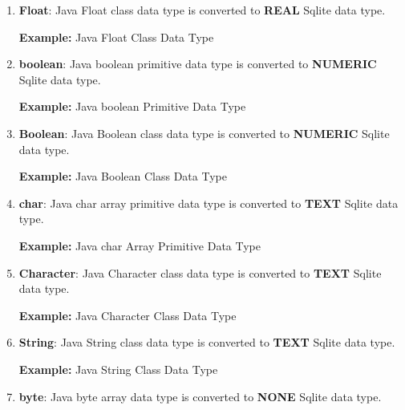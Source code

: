 \begin{enumerate}
	\item \small \textbf{Float}: Java Float class data type is converted to \textbf{REAL} Sqlite data type.

		\par
		\textbf{Example:} Java Float Class Data Type
			

	\item \small \textbf{boolean}: Java boolean primitive data type is converted to \textbf{NUMERIC} Sqlite data type.

		\par
		\textbf{Example:} Java boolean Primitive Data Type
			

	\item \small \textbf{Boolean}: Java Boolean class data type is converted to \textbf{NUMERIC} Sqlite data type.

		\par
		\textbf{Example:} Java Boolean Class Data Type
			

	\item \small \textbf{char}: Java char array primitive data type is converted to \textbf{TEXT} Sqlite data type.

		\par
		\textbf{Example:} Java char Array Primitive Data Type
			

	\item \small \textbf{Character}: Java Character class data type is converted to \textbf{TEXT} Sqlite data type.

		\par
		\textbf{Example:} Java Character Class Data Type
			

	\item \small \textbf{String}: Java String class data type is converted to \textbf{TEXT} Sqlite data type.

		\par
		\textbf{Example:} Java String Class Data Type
			

	\item \small \textbf{byte}: Java byte array data type is converted to \textbf{NONE} Sqlite data type.


\end{enumerate}
